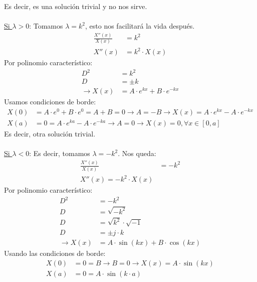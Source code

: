 \documentclass[
  11pt,
  letterpaper,
   answers
  ]{exam}
\begin{document}
\begin{questions}
\begin{solution}
\begin{parts}
            Es decir, es una solución trivial y no nos sirve.
            \\
            \\
        \underline{Si $\lambda > 0$}: Tomamos $\lambda = k^2$, esto nos facilitará la vida después.
        \begin{align}
            \frac{X''(x)}{X(x)} &= k^2 \\
            X''(x) &= k^2 \cdot X(x)
        \end{align}
        Por polinomio característico:
        \begin{align}
            D^2 &= k^2 \\
            D &= \pm k \\
            \rightarrow X(x) &= A \cdot e^{kx} + B \cdot e^{-kx}
        \end{align}
        Usamos condiciones de borde:
        \begin{align}
            X(0) &= A \cdot e^{0} + B \cdot e^{0} = A+B = 0 \rightarrow A = -B \rightarrow X(x) = A \cdot e^{kx} - A \cdot e^{-kx}\\
            X(a) &= 0 = A \cdot e^{ka} - A \cdot e^{-ka} \rightarrow A = 0 \rightarrow X(x) = 0, \forall x \in [0,a]
            \end{align}
            Es decir, otra solución trivial.
            \\
            \\
        \underline{Si $\lambda < 0$}: Es decir, tomamos $\lambda = -k^2$. Nos queda:
        \begin{align}
            \frac{X''(x)}{X(x)} &= -k^2 \\
            X''(x) = -k^2 \cdot X(x)
        \end{align}
        Por polinomio característico:
        \begin{align}
            D^2 &= -k^2 \\
            D &= \sqrt{-k^2} \\
            D &= \sqrt{k^2} \cdot \sqrt{-1} \\
            D &= \pm j \cdot k \\
            \rightarrow X(x) &= A\cdot \sin{(kx)} + B \cdot \cos{(kx)}
        \end{align}
        Usando las condiciones de borde:
        \begin{align}
            X(0) &= 0 = B \rightarrow B = 0 \rightarrow X(x) = A\cdot \sin{(kx)}\\
            X(a) &= 0 = A\cdot \sin{(k \cdot a)}

\end{align}
\end{parts}
\end{solution}
\end{questions}
\end{document}
